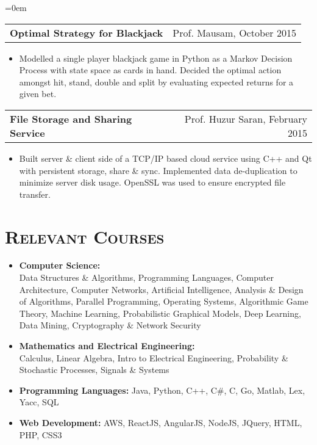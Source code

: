 \documentclass{article}
\makeatletter
\newenvironment{longversion}{}{} %
\newcommand{\headerrow}[2]
{\begin{tabular*}{\linewidth}{l@{\extracolsep{\fill}}r}
	#1 &
	#2 \\
\end{tabular*}}
\newcommand{\tmpsection}[1]{}
\let\tmpsection=\section
\renewcommand{\section}[1]{\tmpsection*{\textsc{#1}}}
\makeatother
\begin{document}
\begin{longversion}
\begin{list} {}{\leftmargin=0em}
\item[]
  \headerrow{ \textbf{Optimal Strategy for Blackjack}} {Prof. Mausam, October 2015}
  \begin{itemize} \item[]
  Modelled a single player blackjack game in Python as a Markov Decision Process with state space as cards in hand. Decided the optimal action amongst hit, stand, double and split by evaluating expected returns for a given bet.
  \end{itemize}

\item[]
  \headerrow{ \textbf{File Storage and Sharing Service}} {Prof. Huzur Saran, February 2015}
  \begin{itemize} \item[]
  Built server \& client side of a TCP/IP based cloud service using C++ and Qt with persistent storage, share \& sync. Implemented data de-duplication to minimize server disk usage. OpenSSL was used to ensure encrypted file transfer.
  \end{itemize}

\end{list}
\end{longversion}

\begin{longversion}
\section{Relevant Courses}
\begin{itemize}
  \setlength\itemsep{-1em}
    \item \textbf{Computer Science:} \\
      Data Structures \& Algorithms, Programming Languages, Computer Architecture, Computer Networks, Artificial Intelligence, Analysis \& Design of Algorithms, Parallel Programming, Operating Systems, Algorithmic Game Theory, Machine Learning, Probabilistic Graphical Models, Deep Learning, Data Mining, Cryptography \& Network Security  \\

    \item \textbf{Mathematics and Electrical Engineering:} \\
      Calculus, Linear Algebra, Intro to Electrical Engineering, Probability \& Stochastic Processes, Signals \& Systems\\
      
      \item \textbf{Programming Languages:} Java, Python, C++, C\#, C, Go, Matlab, Lex, Yacc, SQL\\
      
	   \item \textbf{Web Development:} AWS, ReactJS, AngularJS, NodeJS, JQuery, HTML, PHP, CSS3
\end{itemize}
\end{longversion}
\end{document}
